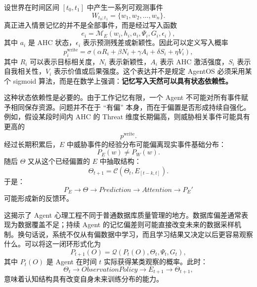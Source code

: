 设世界在时间区间 $[t_0,t_1]$ 中产生一系列可观测事件
\begin{equation}
    W_{t_0:t_1}
    =
    \{w_1,w_2,\ldots,w_n\}.
\end{equation}
真正进入情景记忆的并不是全部事件，而是经过写入函数
\begin{equation}
    e_i
    =
    \mathcal{M}_{E}
    \left(
    w_i,
    h_i,
    a_i,
    \Psi_i,
    G_i,
    \epsilon_i
    \right),
\end{equation}
其中 $a_i$ 是 AHC 状态，$\epsilon_i$ 表示预测残差或新颖性。因此可以定义写入概率
\begin{equation}
    p_i^{\mathrm{write}}
    =
    \sigma
    \left(
    \alpha R_i
    +
    \beta N_i
    +
    \gamma A_i
    +
    \delta S_i
    +
    \eta V_i
    \right),
\end{equation}
其中 $R_i$ 可以表示目标相关度，$N_i$ 表示新颖性，$A_i$ 表示 AHC 激活强度，$S_i$ 表示自我相关性，$V_i$ 表示价值或后果强度。这个表达并不是规定 AgentOS 必须采用某个 sigmoid 算法，而是在数学上强调：\textbf{记忆写入天然可以具有状态依赖性。}

这种状态依赖性是必要的。由于工作记忆有限，一个 Agent 不可能对所有事件赋予相同保存资源。问题并不在于 ``有偏'' 本身，而在于偏置是否形成持续自强化。例如，假设某段时间内 AHC 的 Threat 维度长期偏高，则威胁相关事件可能具有更高的
\begin{equation}
    p^{\mathrm{write}}.
\end{equation}
经过长期积累后，$E$ 中威胁事件的经验分布可能偏离现实事件基础分布：
\begin{equation}
    P_E(w)
    \neq
    P_W(w).
\end{equation}
随后 $\Theta$ 又从这个已经偏置的 $E$ 中抽取结构：
\begin{equation}
    \Theta_{t+1}
    =
    \mathcal{C}
    \left(
    \Theta_t,
    E_{[t-k,t]}
    \right).
\end{equation}
于是：
\begin{equation}
    P_E
    \rightarrow
    \Theta
    \rightarrow
    Prediction
    \rightarrow
    Attention
    \rightarrow
    P_E'
\end{equation}
可能形成新的反馈环。

这揭示了 Agent 心理工程不同于普通数据库质量管理的地方。数据库偏差通常表现为数据覆盖不足；持续 Agent 的记忆偏差则可能直接改变未来的数据采样机制。换句话说，系统不仅从有偏数据中学习，而且学习结果又决定以后更容易观察什么。可以将这一闭环形式化为
\begin{equation}
    P_{t+1}(O)
    =
    \mathcal{Q}
    \left(
    P_t(O),
    \Theta_t,
    \Psi_t,
    G_t
    \right),
\end{equation}
其中 $P_t(O)$ 是 Agent 在时间 $t$ 实际获得某类观察的概率。此时：
\begin{equation}
    \Theta_t
    \rightarrow
    ObservationPolicy
    \rightarrow
    E_{t+1}
    \rightarrow
    \Theta_{t+1},
\end{equation}
意味着认知结构具有改变自身未来训练分布的能力。

